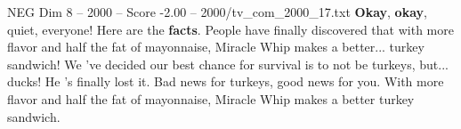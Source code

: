 \begin{textsample}{NEG Dim 8 – 2000 – Score -2.00 – 2000/tv\_com\_2000\_17.txt}  \label{ex:f8_neg_061}
\textbf{Okay}, \textbf{okay}, quiet, everyone!
Here are the \textbf{facts}.
People have finally discovered that with more flavor and half the fat of mayonnaise, Miracle Whip makes a better... turkey sandwich!
We 've decided our best chance for survival is to not be turkeys, but... ducks!
He 's finally lost it.
Bad news for turkeys, good news for you.
With more flavor and half the fat of mayonnaise, Miracle Whip makes a better turkey sandwich.

\end{textsample}
